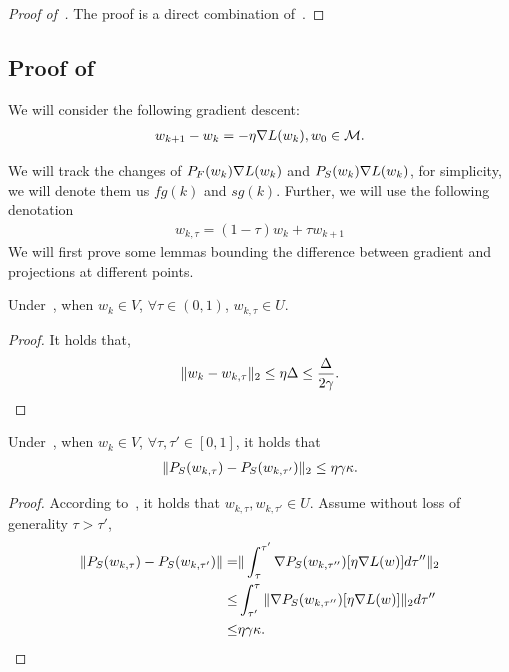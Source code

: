 \begin{proof}[Proof of~]
The proof is a direct combination of~.
\end{proof}


\subsection{Proof of }
\label{app:gd}
We will consider the following gradient descent:
\begin{align}
\label{eq:gd}  
    w_{k + 1} - w_k = - \eta \nabla L(w_k) , w_0 \in \mathcal{M}.
\end{align}



We will track the changes of ${P}_F(w_k) \nabla L(w_k)$ and ${P}_S(w_k) \nabla L(w_k)$, for simplicity, we will denote them us $fg(k)$ and $sg(k)$. Further, we will use the following denotation 
\begin{align*}
    w_{k, \tau} = (1 - \tau) w_k + \tau w_{k + 1}
\end{align*}
    We will first prove some lemmas bounding the difference between gradient and projections at different points.


    \begin{lemma}
    \label{lem:stayinU}
    Under~, when $w_k \in V$, $\forall \tau \in (0,1)$, $w_{k, \tau} \in U$.
    \end{lemma}

    \begin{proof}
        It holds that,
        \begin{align*}
            \| w_k - w_{k, \tau} \|_2 \le \eta \Delta \le \frac{\Delta}{2\gamma}.
        \end{align*}
    \end{proof}


    \begin{lemma}
    \label{lem:moveps}
         Under~, when $w_k \in V$, $\forall \tau, \tau' \in [0, 1]$, it holds that 
        \begin{align*}
            \|  {P}_S(w_{k, \tau})  - {P}_S(w_{k, \tau'}) \|_2 \le \eta \gamma \kappa.
        \end{align*} 
    \end{lemma}


    \begin{proof}
        According to~, it holds that $w_{k, \tau}, w_{k, \tau'} \in U$.
        Assume without loss of generality $\tau > \tau'$,
        \begin{align*}
            \| {P}_S(w_{k, \tau})  - {P}_S(w_{k, \tau'}) \| =&
            \| \int_{\tau}^{\tau'} \nabla {P}_S(w_{k, \tau''})[\eta \nabla L(w)] d\tau''  \|_2 \\
            \le& \int_{\tau'}^\tau \|   \nabla {P}_S(w_{k, \tau''})[\eta \nabla L(w)]  \|_2 d\tau''  \\
            \le & \eta \gamma \kappa.
        \end{align*}
    \end{proof}
    

